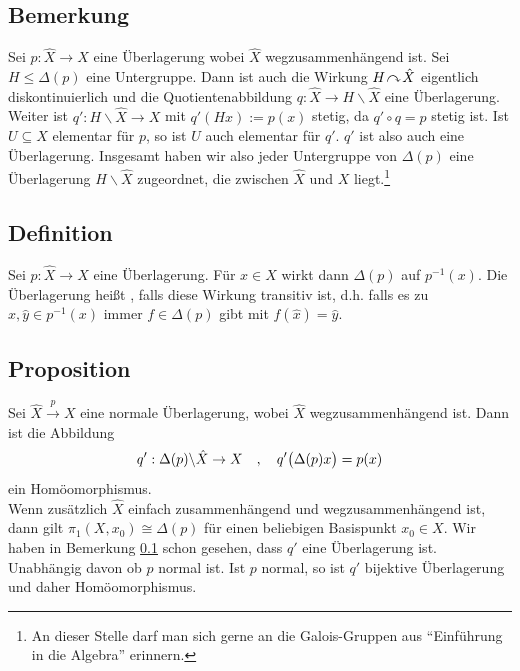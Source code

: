 \subsection[Bemerkung zu Untergruppen der Decktransformationsgruppe]{Bemerkung} %
\label{sub:12.8}
\begin{figure}
\end{figure}
Sei $p : \hat{X} \to X$ eine Überlagerung wobei $\hat{X}$ wegzusammenhängend ist. Sei $H \le \Delta(p)$ eine Untergruppe. Dann ist auch die Wirkung $H \wirkung \hat{X}$
eigentlich diskontinuierlich und die Quotientenabbildung $q : \hat{X} \to H \backslash \hat{X}$ eine Überlagerung. Weiter ist $q' : H \backslash \hat{X} \to X$ mit
$q'(Hx) := p(x)$ stetig, da $q' \circ q = p$ stetig ist. Ist $U \subseteq X$ elementar für $p$, so ist $U$ auch elementar für $q'$. $q'$ ist also auch eine Überlagerung.
Insgesamt haben wir also jeder Untergruppe von $\Delta (p)$ eine Überlagerung $H \backslash \hat{X}$ zugeordnet, die zwischen $\hat{X}$ und $X$ liegt.\footnote{An dieser
Stelle darf man sich gerne an die Galois-Gruppen aus \enquote{Einführung in die Algebra} erinnern.}

\subsection[Definition: Normale Überlagerung]{Definition} %
\label{sub:12.9}
Sei $p : \hat{X} \to X$ eine Überlagerung. Für $x \in X$ wirkt dann $\Delta(p)$ auf $p^{-1}(x)$. Die Überlagerung heißt 
, falls diese Wirkung transitiv ist, d.h. falls es zu $\hat{x}, \hat{y} \in p^{-1}(x)$ immer $f \in \Delta(p)$ gibt mit 
$f(\hat{x})= \hat{y}$.

\subsection[Proposition: Für normale Überlagerungen ist \protect{$q' :\Delta(p)\text{\textbackslash{}} \hat{X} \to X$} Homöomorphismus]{Proposition} %
\label{sub:1210}
Sei $\hat{X} \xrightarrow{p} X $ eine normale Überlagerung, wobei $\hat{X}$ wegzusammenhängend ist. Dann ist die Abbildung 
\[
	q' : \Delta(p)\backslash \hat{X} \to X \quad , \quad q' \enbrace[\big]{\Delta(p) x} = p(x)
\]
ein Homöomorphismus. \\
Wenn zusätzlich $\hat{X}$ einfach zusammenhängend und wegzusammenhängend ist, dann gilt $\pi_1(X, x_0) \cong \Delta(p)$ für einen beliebigen Basispunkt $x_0 \in X$.
Wir haben in Bemerkung \ref{sub:12.8} schon gesehen, dass $q'$ eine Überlagerung ist. Unabhängig davon ob $p$ normal ist. Ist $p$ normal, so ist $q'$ bijektive 
Überlagerung und daher Homöomorphismus. \bewende 
\newpage

